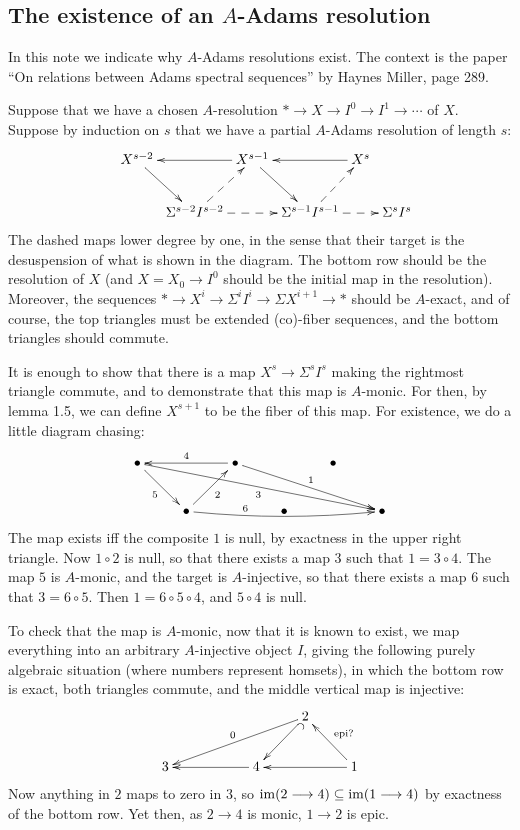 \documentclass[11pt]{article}
\newcommand{\myheading}[1]
{{\noindent\Large #1}

}
\renewcommand{\myheading}[1]{\subsection{#1}}
\begin{document}
\begin{A-adams resolutions}
\myheading{The existence of an \texorpdfstring{$A$}{A}-Adams resolution}
In this note we indicate why $A$-Adams resolutions exist. The context is the
paper ``On relations between Adams spectral sequences'' by Haynes Miller, page
289.

Suppose that we have a chosen $A$-resolution $*\to X\to I^0\to I^1\to\cdots$ of
$X$. Suppose by induction on $s$ that we have a partial $A$-Adams resolution of
length $s$:
\[\xymatrix@C=.1cm{
&X^{s-2}\ar[dr]&&X^{s-1} \ar[dr]\ar[ll]&&X^s\ar[ll]\\
&&\Sigma^{s-2}I^{s-2}\ar@{-->}[rr]\ar@{-->}[ur]
&&\Sigma^{s-1}I^{s-1}\ar@{-->}[rr]\ar@{-->}[ur]&&\Sigma^{s}I^{s}
}\]
The dashed maps lower degree by one, in the sense that their target is the
desuspension of what is shown in the diagram. The bottom row should be the
resolution of $X$ (and $X=X_0\to I^0$ should be the initial map in the
resolution). Moreover, the sequences $*\to X^i\to\Sigma^iI^i\to\Sigma
X^{i+1}\to*$ should be $A$-exact, and of course, the top triangles must be
extended (co)-fiber sequences, and the bottom triangles should commute.

It is enough to show that there is a map $X^s\to \Sigma^sI^s$ making the
rightmost triangle commute, and to demonstrate that this map is $A$-monic. For
then, by lemma 1.5, we can define $X^{s+1}$ to be the fiber of this map. For
existence, we do a little diagram chasing:
\[\xymatrix{
\bullet\ar[rd]_5\ar[rrrrrd]_3&& \bullet\ar[rrrd]^1\ar[ll]_4&&\bullet\\
&\bullet\ar[ru]_2\ar@/_.31pc/[rrrr]^(.3){6}&&\bullet&&\bullet
}\]
The map exists iff the composite $1$ is null, by exactness in the upper right
triangle. Now $1\circ2$ is null, so that there exists a map $3$ such that
$1=3\circ4$. The map $5$ is $A$-monic, and the target is $A$-injective, so that
there exists a map $6$ such that $3=6\circ5$. Then $1=6\circ5\circ4$, and
$5\circ4$ is null.

To check that the map is $A$-monic, now that it is known to exist, we map
everything into an arbitrary $A$-injective object $I$, giving the following
purely algebraic situation (where numbers represent homsets), in which the
bottom row is exact, both triangles commute, and the middle vertical map is
injective:
\[\xymatrix{
&&&2\ar[lldl]_0\ar@{^{(}->}[ld]\\
3&&\ar[ll]4&&1\ar[ll]\ar[lu]_{\text{epi?}}
}\]
Now anything in $2$ maps to zero in 3, so $\operatorname{im}(2\longrightarrow4)\subseteq\operatorname{im}(1\longrightarrow4)$ by
exactness of the bottom row. Yet then, as $2\to4$ is monic, $1\to2$ is epic.


\end{A-adams resolutions}
\end{document}
